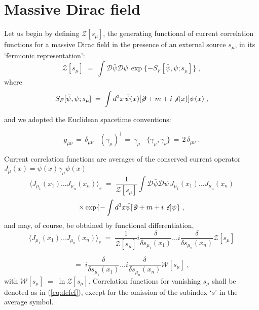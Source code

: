 \documentclass[a4paper,12pt]{article}
\begin{document}
\section{Massive Dirac field}\label{dirac}
Let us begin by defining ${\mathcal Z}[s_\mu]$, the generating
functional of current correlation functions for a massive Dirac field
in the presence of an external source $s_\mu$, in its
`fermionic representation':
\begin{equation}
  \label{eq:defzf}
  {\mathcal Z}[s_\mu] \;=\; \int {\mathcal D}{\bar\psi} {\mathcal
    D}\psi \, \exp\{- S_F[{\bar\psi},\psi; s_\mu]\} \;,
\end{equation}
where
\begin{equation}
S_F[{\bar\psi},\psi; s_\mu] \;=\;\int d^3x \, {\bar\psi}(x)[\not\!\partial + m +
    i \not \! s (x)] \psi(x) \;,
\end{equation}

and we adopted the Euclidean spacetime conventions:

\begin{equation}
  \label{eq:conv1}
  g_{\mu\nu}\,=\, \delta_{\mu\nu} \;\;\; (\gamma_\mu)^\dagger \,=\,
  \gamma_\mu \;\;\; \{ \gamma_\mu , \gamma_\nu \}\,=\, 2\,
  \delta_{\mu\nu} \;.
\end{equation}

Current correlation functions are averages of the conserved current
operator $J_\mu (x) = {\bar\psi}(x)\gamma_\mu \psi(x)$
$$
\langle J_{\mu_1} (x_1) \ldots J_{\mu_n} (x_n) \rangle_s \;=\; \frac{1}{{\mathcal
    Z}[s_\mu]} \int {\mathcal D}{\bar \psi} {\mathcal D}\psi \, J_{\mu_1} (x_1) \ldots
J_{\mu_n} (x_n)
$$
\begin{equation}
 \label{eq:defcf}
\times \exp\{-\int d^3x {\bar\psi}[\not\!\partial + m + i \not \! s]
\psi\} \;,
\end{equation}
and may, of course, be obtained by functional differentiation,
$$
\langle J_{\mu_1} (x_1) \ldots J_{\mu_n} (x_n) \rangle_s \;=\;
\frac{1}{{\mathcal Z}[s_\mu]}
i \frac{\delta}{\delta s_{\mu_1}(x_1)} \ldots i
\frac{\delta}{\delta s_{\mu_n}(x_n)}{\mathcal Z}[s_\mu]
$$

\begin{equation}
  \label{eq:funcdif}
=\; i \frac{\delta}{\delta s_{\mu_1}(x_1)} \ldots i\frac{\delta}{\delta s_{\mu_n}(x_n)}
{\mathcal W}[s_\mu] \;,
\end{equation}
with ${\mathcal W}[s_\mu]\;=\; \ln {\mathcal Z}[s_\mu]$. Correlation
functions for vanishing $s_\mu$ shall be denoted as in (\ref{eq:defcf}),
except for the omission of the subindex `$s$' in the average symbol.
\end{document}
